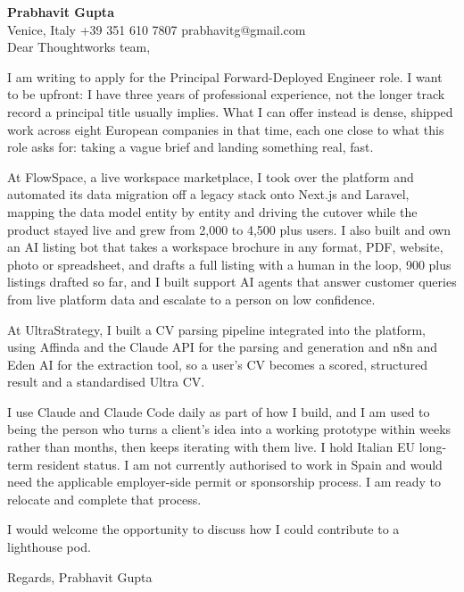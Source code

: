 \documentclass[a4paper,10.5pt]{article}
\begin{document}
\textbf{Prabhavit Gupta}\\
Venice, Italy \textbar{} +39 351 610 7807 \textbar{} prabhavitg@gmail.com\\[10pt]
Dear Thoughtworks team,

I am writing to apply for the Principal Forward-Deployed Engineer role. I want to be upfront: I have three years of professional experience, not the longer track record a principal title usually implies. What I can offer instead is dense, shipped work across eight European companies in that time, each one close to what this role asks for: taking a vague brief and landing something real, fast.

At FlowSpace, a live workspace marketplace, I took over the platform and automated its data migration off a legacy stack onto Next.js and Laravel, mapping the data model entity by entity and driving the cutover while the product stayed live and grew from 2,000 to 4,500 plus users. I also built and own an AI listing bot that takes a workspace brochure in any format, PDF, website, photo or spreadsheet, and drafts a full listing with a human in the loop, 900 plus listings drafted so far, and I built support AI agents that answer customer queries from live platform data and escalate to a person on low confidence.

At UltraStrategy, I built a CV parsing pipeline integrated into the platform, using Affinda and the Claude API for the parsing and generation and n8n and Eden AI for the extraction tool, so a user's CV becomes a scored, structured result and a standardised Ultra CV.

I use Claude and Claude Code daily as part of how I build, and I am used to being the person who turns a client's idea into a working prototype within weeks rather than months, then keeps iterating with them live. I hold Italian EU long-term resident status. I am not currently authorised to work in Spain and would need the applicable employer-side permit or sponsorship process. I am ready to relocate and complete that process.

I would welcome the opportunity to discuss how I could contribute to a lighthouse pod.

Regards,
Prabhavit Gupta
\end{document}
